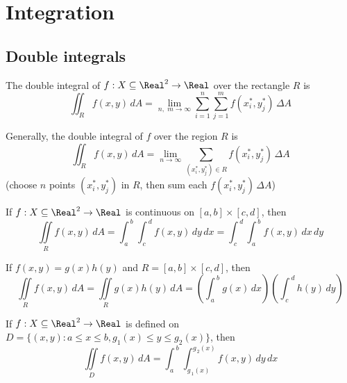 \section{Integration}

\subsection{Double integrals}



\begin{definition}
  The double integral of $f : X \subseteq \Real^2 \to \Real$ over the rectangle $R$ is
  \[
    \iint_{R}{{f\left( {x,y} \right)\,dA}} = \mathop {\lim }_{n,\,\,m \to \infty } \sum_{i = 1}^n {\sum_{j = 1}^m {f\left( {x_i^*,y_j^*} \right)\,\Delta A} }
  \]

  Generally, the double integral of $f$ over the region $R$ is
  \[
    \iint_{R}{{f\left( {x,y} \right)\,dA}} = \mathop {\lim }_{n \to \infty } \sum_{(x_i^*, y_j^*) \in R} {f\left( {x_i^*,y_j^*} \right)\,\Delta A}
  \]
  (choose $n$ points $(x_i^*, y_j^*)$ in $R$, then sum each $f\left( {x_i^*,y_j^*} \right)\,\Delta A$)
\end{definition}

\begin{theorem}
  If $f : X \subseteq \Real^2 \to \Real$ is continuous on $[a, b] \times [c, d]$, then
  \[
    \iint\limits_{R}{{f\left( {x,y} \right)\,dA}} = \int_{{\,a}}^{{\,b}}{{\int_{{\,c}}^{{\,d}}{{f\left( {x,y} \right)\,dy}}\,dx}} = \int_{{\,c}}^{{\,d}}{{\int_{{\,a}}^{{\,b}}{{f\left( {x,y} \right)\,dx}}\,dy}}
  \]
\end{theorem}

\begin{theorem}
  If $f(x, y) = g(x) h(y)$ and $R = [a, b] \times [c, d]$, then
  \[
    \iint\limits_{R}{{f\left( {x,y} \right)\,dA}} = \iint\limits_{R}{{g\left( x \right)h\left( y \right)\,dA}} = \left( {\int_{{\,a}}^{{\,b}}{{g\left( x \right)\,dx}}} \right)\left( {\int_{{\,c}}^{{\,d}}{{h\left( y \right)\,dy}}} \right)
  \]
\end{theorem}

\begin{theorem}
  If $f : X \subseteq \Real^2 \to \Real$ is defined on $D = \{ (x, y) : a \leq x \leq b, g_1(x) \leq y \leq g_2(x) \}$, then
  \[
    \iint\limits_{D}{{f\left( {x,y} \right)\,dA}} = \int_{{\,a}}^{{\,b}}{{\int_{{{g_{\,1}}\left( x \right)}}^{{{g_{\,2}}\left( x \right)}}{{f\left( {x,y} \right)\,dy}}\,dx}}
  \]
\end{theorem}

